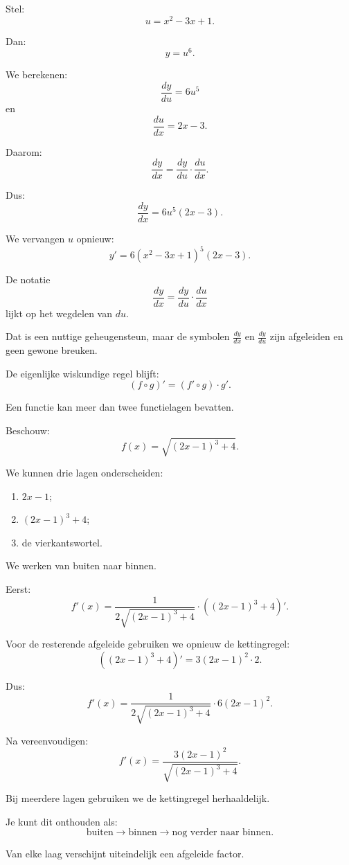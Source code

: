 \documentclass{ximera}
\begin{document}
Stel:
\[u=x^2-3x+1.\]

Dan:
\[y=u^6.\]

We berekenen:
\[\frac{dy}{du}=6u^5\]
en
\[\frac{du}{dx}=2x-3.\]

Daarom:
\[
\frac{dy}{dx}
=
\frac{dy}{du}\cdot\frac{du}{dx}.
\]

Dus:
\[
\frac{dy}{dx}
=
6u^5(2x-3).
\]

We vervangen $u$ opnieuw:
\[\boxed{y'=6(x^2-3x+1)^5(2x-3).}\]


\begin{opmerking}
De notatie
\[\frac{dy}{dx}=\frac{dy}{du}\cdot\frac{du}{dx}\]
lijkt op het wegdelen van $du$.

Dat is een nuttige geheugensteun, maar de symbolen
$\frac{dy}{dx}$ en $\frac{dy}{du}$ zijn afgeleiden en geen gewone
breuken.

De eigenlijke wiskundige regel blijft:
\[\boxed{(f\circ g)'=(f'\circ g)\cdot g'.}\]
\end{opmerking}




Een functie kan meer dan twee functielagen bevatten.

Beschouw:
\[f(x)=\sqrt{(2x-1)^3+4}.\]

We kunnen drie lagen onderscheiden:

\begin{enumerate}
  \item $2x-1$;
  \item $(2x-1)^3+4$;
  \item de vierkantswortel.
\end{enumerate}

We werken van buiten naar binnen.

Eerst:
\[
f'(x)
=
\frac{1}{2\sqrt{(2x-1)^3+4}}
\cdot
\left((2x-1)^3+4\right)'.
\]

Voor de resterende afgeleide gebruiken we opnieuw de kettingregel:
\[
\left((2x-1)^3+4\right)'
=
3(2x-1)^2\cdot2.
\]

Dus:
\[
f'(x)
=
\frac{1}{2\sqrt{(2x-1)^3+4}}
\cdot
6(2x-1)^2.
\]

Na vereenvoudigen:
\[\boxed{f'(x)=\frac{3(2x-1)^2}{\sqrt{(2x-1)^3+4}}.}\]


\begin{opmerking}
Bij meerdere lagen gebruiken we de kettingregel herhaaldelijk.

Je kunt dit onthouden als:
\[\boxed{\text{buiten}\longrightarrow\text{binnen}\longrightarrow
\text{nog verder naar binnen}.}\]

Van elke laag verschijnt uiteindelijk een afgeleide factor.
\end{opmerking}
\end{document}
